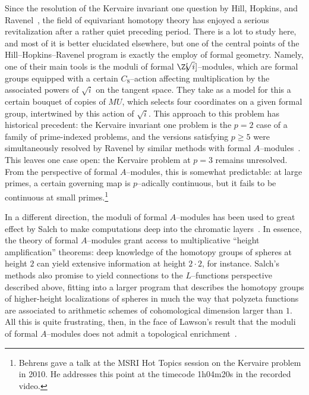 Since the resolution of the Kervaire invariant one question by Hill, Hopkins, and Ravenel~\cite{HHR}, the field of equivariant homotopy theory has enjoyed a serious revitalization after a rather quiet preceding period.  There is a lot to study here, and most of it is better elucidated elsewhere, but one of the central points of the Hill--Hopkins--Ravenel program is exactly the employ of formal geometry.  Namely, one of their main tools is the moduli of formal \(\Z[\!\!\sqrt{i}]\)--modules, which are formal groups equipped with a certain \(C_8\)--action affecting multiplication by the associated powers of \(\!\!\sqrt{i}\) on the tangent space.  They take as a model for this a certain bouquet of copies of \(MU\), which selects four coordinates on a given formal group, intertwined by this action of \(\!\!\sqrt{i}\).  This approach to this problem has historical precedent: the Kervaire invariant one problem is the \(p = 2\) case of a family of prime-indexed problems, and the versions satisfying \(p \ge 5\) were simultaneously resolved by Ravenel by similar methods with formal \(A\)--modules~\cite{RavenelNonexistenceArfInvariantElts}.  This leaves one case open: the Kervaire problem at \(p = 3\) remains unresolved.  From the perspective of formal \(A\)--modules, this is somewhat predictable: at large primes, a certain governing map is \(p\)--adically continuous, but it fails to be continuous at small primes.\footnote{Behrens gave a talk at the MSRI Hot Topics session on the Kervaire problem in 2010.  He addresses this point at the timecode 1h04m20s in the recorded video.}

In a different direction, the moduli of formal \(A\)--modules has been used to great effect by Salch to make computations deep into the chromatic layers~\cite{Salch}.  In essence, the theory of formal \(A\)--modules grant access to multiplicative ``height amplification'' theorems: deep knowledge of the homotopy groups of spheres at height \(2\) can yield extensive information at height \(2 \cdot 2\), for instance.  Salch's methods also promise to yield connections to the \(L\)--functions perspective described above, fitting into a larger program that describes the homotopy groups of higher-height localizations of spheres in much the way that polyzeta functions are associated to arithmetic schemes of cohomological dimension larger than \(1\).  All this is quite frustrating, then, in the face of Lawson's result that the moduli of formal \(A\)--modules does not admit a topological enrichment~\cite{LawsonRealizability}.

